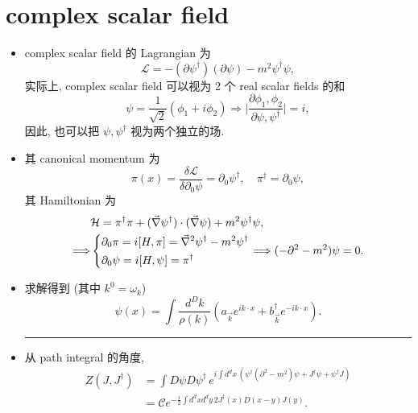 \section{complex scalar field} \label{4.4}
\begin{itemize}
	\item complex scalar field 的 Lagrangian 为
	\begin{equation}
		\mathcal{L} = - (\partial \psi^\dag) (\partial \psi) - m^2 \psi^\dag \psi,
	\end{equation}
	实际上, complex scalar field 可以视为 2 个 real scalar fields 的和
	\begin{equation}
		\psi = \frac{1}{\sqrt{2}} (\phi_1 + i \phi_2) \Longrightarrow \Big| \frac{\partial \phi_1, \phi_2}{\partial \psi, \psi^\dag} \Big| = i,
	\end{equation}
	因此, 也可以把 $\psi, \psi^\dag$ 视为两个独立的场.
	
	\item 其 canonical momentum 为
	\begin{equation}
		\pi(x) = \frac{\delta \mathcal{L}}{\delta \partial_0 \psi} = \partial_0 \psi^\dag, \quad \pi^\dag = \partial_0 \psi,
	\end{equation}
	其 Hamiltonian 为
	\begin{align}
		& \mathcal{H} = \pi^\dag \pi + (\vec{\nabla} \psi^\dag) \cdot (\vec{\nabla} \psi) + m^2 \psi^\dag \psi, \\
		\Longrightarrow & \begin{dcases}
			\partial_0 \pi = i [H, \pi] = \vec{\nabla}^2 \psi^\dag - m^2 \psi^\dag \\
			\partial_0 \psi = i [H, \psi] = \pi^\dag
		\end{dcases} \Longrightarrow (- \partial^2 - m^2) \psi = 0.
	\end{align}
	
	\item 求解得到 (其中 $k^0 = \omega_k$)
	\begin{equation}
		\psi(x) = \int \frac{d^D k}{\rho(k)} (a_{\vec{k}} e^{i k \cdot x} + b^\dag_{\vec{k}} e^{- i k \cdot x}).
	\end{equation}
	
	\noindent\rule[0.5ex]{\linewidth}{0.5pt} %
	
	\item 从 path integral 的角度,
	\begin{align}
		Z(J, J^\dag) &= \int D\psi D\psi^\dag \, e^{i \int d^d x \, (\psi^\dag (\partial^2 - m^2) \psi + J^\dag \psi + \psi^\dag J)} \\
		&= \mathcal{C} e^{- \frac{i}{2} \int d^d x d^d y \, 2 J^\dag(x) D(x - y) J(y)}.
	\end{align}
	

\end{itemize}
